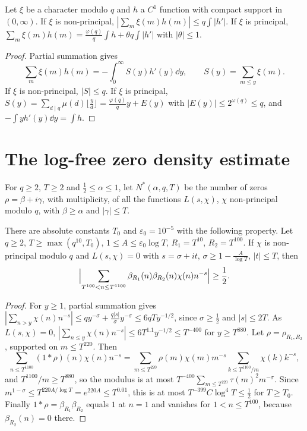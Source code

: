 \begin{lemma}\label{lem:smoothchar}
Let $\xi$ be a character modulo $q$ and $h$ a $C^1$ function with compact support in $(0,\infty)$. If $\xi$ is non-principal, $|\sum_m\xi(m)h(m)|\le q\int|h'|$. If $\xi$ is principal, $\sum_m\xi(m)h(m)=\frac{\varphi(q)}q\int h+\theta q\int|h'|$ with $|\theta|\le1$.
\end{lemma}
\begin{proof}
Partial summation gives
\[
\sum_m\xi(m)h(m)=-\int_0^\infty S(y)h'(y)\dd y,\qquad S(y)=\sum_{m\le y}\xi(m).
\]
 If $\xi$ is non-principal, $|S|\le q$. If $\xi$ is principal, $S(y)=\sum_{d\mid q}\mu(d)\lfloor\frac yd\rfloor=\frac{\varphi(q)}qy+E(y)$ with $|E(y)|\le2^{\omega(q)}\le q$, and $-\int yh'(y)\dd y=\int h$.
\end{proof}

\section{The log-free zero density estimate}

For $q\ge2$, $T\ge2$ and $\frac12\le\alpha\le1$, let $N^*(\alpha,q,T)$ be the number of zeros $\rho=\beta+i\gamma$, with multiplicity, of all the functions $L(s,\chi)$, $\chi$ non-principal modulo $q$, with $\beta\ge\alpha$ and $|\gamma|\le T$.

\begin{lemma}\label{lem:detector}
There are absolute constants $T_0$ and $\varepsilon_0=10^{-5}$ with the following property. Let $q\ge2$, $T\ge\max(q^{10},T_0)$, $1\le A\le\varepsilon_0\log T$, $R_1=T^{10}$, $R_2=T^{100}$. If $\chi$ is non-principal modulo $q$ and $L(s,\chi)=0$ with $s=\sigma+it$, $\sigma\ge1-\frac A{\log T}$, $|t|\le T$, then
\[
\Bigl|\sum_{T^{100}<n\le T^{1100}}\beta_{R_1}(n)\beta_{R_2}(n)\chi(n)n^{-s}\Bigr|\ge\frac12.
\]
\end{lemma}
\begin{proof}
For $y\ge1$, partial summation gives $|\sum_{n>y}\chi(n)n^{-s}|\le qy^{-\sigma}+\frac{q|s|}\sigma y^{-\sigma}\le6qTy^{-1/2}$, since $\sigma\ge\frac12$ and $|s|\le2T$. As $L(s,\chi)=0$, $|\sum_{n\le y}\chi(n)n^{-s}|\le6T^{1.1}y^{-1/2}\le T^{-400}$ for $y\ge T^{880}$. Let $\rho=\rho_{R_1,R_2}$, supported on $m\le T^{220}$. Then
\[
\sum_{n\le T^{1100}}(1*\rho)(n)\chi(n)n^{-s}=\sum_{m\le T^{220}}\rho(m)\chi(m)m^{-s}\sum_{k\le T^{1100}/m}\chi(k)k^{-s},
\]
and $T^{1100}/m\ge T^{880}$, so the modulus is at most $T^{-400}\sum_{m\le T^{220}}\tau(m)^2m^{-\sigma}$. Since $m^{1-\sigma}\le T^{220A/\log T}=e^{220A}\le T^{0.01}$, this is at most $T^{-399}C\log^4T\le\frac12$ for $T\ge T_0$. Finally $1*\rho=\beta_{R_1}\beta_{R_2}$ equals $1$ at $n=1$ and vanishes for $1<n\le T^{100}$, because $\beta_{R_2}(n)=0$ there.
\end{proof}

